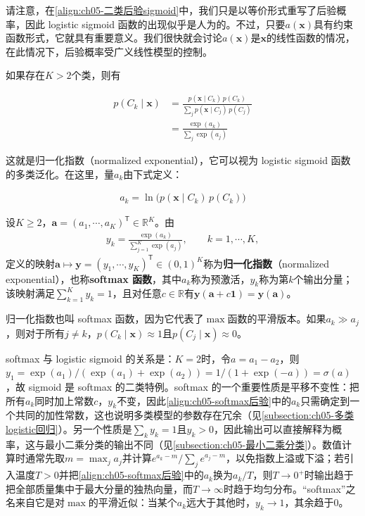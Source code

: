 \documentclass[../../main.tex]{subfiles}
\begin{document}
请注意，在\eqref{align:ch05-二类后验sigmoid}中，我们只是以等价形式重写了后验概率，因此 logistic sigmoid 函数的出现似乎是人为的。不过，只要$a(\boldsymbol{x})$具有约束函数形式，它就具有重要意义。我们很快就会讨论$a(\boldsymbol{x})$是$\boldsymbol{x}$的线性函数的情况，在此情况下，后验概率受广义线性模型的控制。

如果存在$K>2$个类，则有

\begin{align}
  p(C_k\mid\boldsymbol{x})&=\frac{p(\boldsymbol{x}\mid C_k)\,p(C_k)}{\sum_j p(\boldsymbol{x}\mid C_j)\,p(C_j)}\nonumber\\
  &=\frac{\exp(a_k)}{\sum_j\exp(a_j)}
  \label{align:ch05-softmax后验}
\end{align}

这就是归一化指数（normalized exponential），它可以视为 logistic sigmoid 函数的多类泛化。在这里，量$a_k$由下式定义：

\begin{align}
  a_k=\ln\bigl(p(\boldsymbol{x}\mid C_k)\,p(C_k)\bigr)
  \label{align:ch05-预激活定义}
\end{align}

\begin{definition}\label{definition:ch05-归一化指数}
设$K\geqslant2$，$\boldsymbol{a}=(a_1,\cdots,a_K)^{\mathsf{T}}\in\mathbb{R}^{K}$。由
\begin{align}
  y_k=\frac{\exp(a_k)}{\sum_{j=1}^{K}\exp(a_j)},\qquad k=1,\cdots,K,
\end{align}
定义的映射$\boldsymbol{a}\mapsto\boldsymbol{y}=(y_1,\cdots,y_K)^{\mathsf{T}}\in(0,1)^{K}$称为\textbf{归一化指数}（normalized exponential），也称\textbf{softmax 函数}，其中$a_k$称为预激活，$y_k$称为第$k$个输出分量；该映射满足$\sum_{k=1}^{K}y_k=1$，且对任意$c\in\mathbb{R}$有$\boldsymbol{y}(\boldsymbol{a}+c\boldsymbol{1})=\boldsymbol{y}(\boldsymbol{a})$。
\end{definition}

归一化指数也叫 softmax 函数，因为它代表了$\max$函数的平滑版本。如果$a_k\gg a_j$，则对于所有$j\neq k$，$p(C_k\mid\boldsymbol{x})\approx 1$且$p(C_j\mid\boldsymbol{x})\approx 0$。

\begin{remark}
softmax 与 logistic sigmoid 的关系是：$K=2$时，令$a=a_1-a_2$，则$y_1=\exp(a_1)/(\exp(a_1)+\exp(a_2))=1/(1+\exp(-a))=\sigma(a)$，故 sigmoid 是 softmax 的二类特例。softmax 的一个重要性质是平移不变性：把所有$a_k$同时加上常数$c$，$y_k$不变，因此\eqref{align:ch05-softmax后验}中的$a_k$只需确定到一个共同的加性常数，这也说明多类模型的参数存在冗余（见\cref{subsection:ch05-多类logistic回归}）。另一个性质是$\sum_k y_k=1$且$y_k>0$，因此输出可以直接解释为概率，这与最小二乘分类的输出不同（见\cref{subsection:ch05-最小二乘分类}）。数值计算时通常先取$m=\max_j a_j$并计算$e^{a_k-m}/\sum_j e^{a_j-m}$，以免指数上溢或下溢；若引入温度$T>0$并把\eqref{align:ch05-softmax后验}中的$a_k$换为$a_k/T$，则$T\to0^{+}$时输出趋于把全部质量集中于最大分量的独热向量，而$T\to\infty$时趋于均匀分布。“softmax”之名来自它是对$\max$的平滑近似：当某个$a_k$远大于其他时，$y_k\to1$，其余趋于0。
\end{remark}
\end{document}

